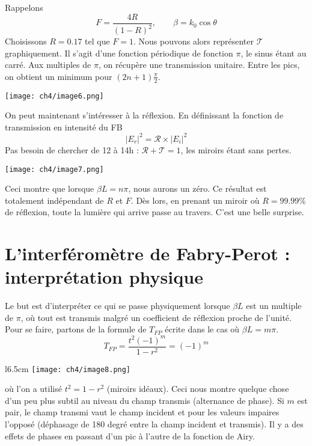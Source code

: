 Rappelons 
\begin{equation}
F = \dfrac{4R}{(1-R)^2},\qquad \beta = k_0\cos\theta
\end{equation}
Choisissons $R=0.17$ tel que $F = 1$. Nous pouvons alors représenter $\mathcal{T}$ 
graphiquement. Il s'agit d'une fonction périodique de fonction $\pi$, le sinus étant 
au carré. Aux multiples de $\pi$, on récupère une transmission unitaire. Entre les pics, on 
obtient un minimum pour $(2n+1)\frac{\pi}{2}$.  

\begin{center}
	\texttt{[image: ch4/image6.png]}
\end{center}

On peut maintenant s'intéresser à la réflexion. En définissant la fonction de transmission 
en intensité du FB 
\begin{equation}
|E_r|^2 = \mathcal{R}\times|E_i|^2
\end{equation}
Pas besoin de chercher de 12 à 14h : $\mathcal{R}+\mathcal{T}=1$, les miroirs étant sans 
pertes. 

\begin{center}
	\texttt{[image: ch4/image7.png]}
\end{center}

Ceci montre que lorsque $\beta L = n\pi$, nous aurons un zéro. Ce résultat est totalement 
indépendant de $R$ et $F$. Dès lors, en prenant un miroir où $R=99.99\%$ de réflexion, 
toute la lumière qui arrive passe au travers. C'est une belle surprise. 

\newpage
\section{L'interféromètre de Fabry-Perot : interprétation physique}
Le but est d'interpréter ce qui se passe physiquement lorsque $\beta L$ est un multiple de 
$\pi$, où tout est transmis malgré un coefficient de réflexion proche de l'unité. Pour se 
faire, partons de la formule de $T_{FP}$ écrite dans le cas où $\beta L = m\pi$.
\begin{equation}
T_{FP} = \frac{t^2(-1)^m}{1-r^2} = (-1)^m
\end{equation}

	\begin{wrapfigure}[10]{l}{6.5cm}
	\vspace{-5mm}
	\texttt{[image: ch4/image8.png]}
	\end{wrapfigure}
où l'on a utilisé $t^2 = 1-r^2$ (miroirs idéaux). Ceci nous montre quelque chose d'un peu 
plus subtil au niveau du champ transmis (alternance de phase). Si $m$ est pair, le champ 
transmi vaut le champ incident et pour les valeurs impaires l'opposé (déphasage de 180 degré 
entre la champ incident et transmis). Il y a des effets de phases en passant d'un pic à l'autre 
de la fonction de Airy. \\


